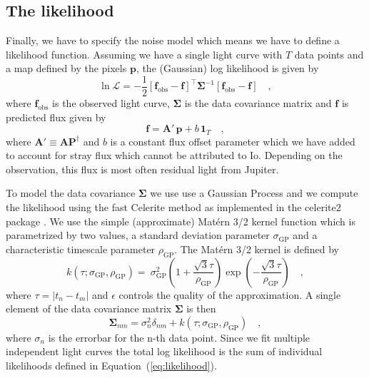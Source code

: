 \documentclass[linenumbers,modern]{aastex62}
\begin{document}
\subsection{The likelihood}
\label{ssec:likelihood}
Finally, we have to specify the noise model which means we have to define a likelihood function.
Assuming we have a single light curve with $T$ data points and a map defined by the pixels $\mathbf{p}$, the (Gaussian) log likelihood is given by
\begin{equation}
    \ln\mathcal{L}=-\frac{1}{2}\left[\mathbf{f}_\mathrm{obs}-\mathbf{f} \right]^{\top}
    \boldsymbol{\Sigma}^{-1}\left[\mathbf{f}_\mathrm{obs}-\mathbf{f} \right]
    \quad,
    \label{eq:likelihood}
\end{equation}
where $\mathbf{f}_\mathrm{obs}$ is the observed light curve, $\boldsymbol{\Sigma}$ is the data covariance matrix and $\mathbf{f}$ is predicted flux given by
\begin{equation}
    \mathbf{f}=\mathbf{A}'\,\mathbf{p} +b\,\mathbf{1}_T
    \quad,
    \label{eq:flux_model}
\end{equation}
where $\mathbf{A}'\equiv\mathbf{A}\mathbf{P}^\dagger$ and $b$ is a constant flux offset parameter which we have added to account for stray flux which cannot be attributed to Io.
Depending on the observation, this flux is most often residual light from Jupiter.

To model the data covariance $\boldsymbol{\Sigma}$ we use use a Gaussian Process and we compute the likelihood using the fast Celerite method \citep{foreman-mackey2017} as implemented in the \textsf{celerite2} package \citep{foreman-mackey2017a,foreman-mackey2018}.
We use the simple (approximate) Mat\'ern 3/2 kernel function which is parametrized by two values, a standard deviation parameter $\sigma_\mathrm{GP}$ and a characteristic timescale parameter $\rho_\mathrm{GP}$.
The Mat\'ern 3/2 kernel is defined by
\begin{equation}
    k(\tau;\sigma_\mathrm{GP},
    \rho_\mathrm{GP})=\
    \sigma_\mathrm{GP}^{2}\left(1+\frac{\sqrt{3} \tau}{\rho_\mathrm{GP}}\right) \exp \left(-\frac{\sqrt{3} \tau}{\rho_\mathrm{GP}}\right)
    \quad,
\end{equation}
where $\tau=|t_n-t_m|$ and $\epsilon$ controls the quality of the approximation.
A single element of the data covariance matrix $\boldsymbol{\Sigma}$ is then 
\begin{equation}
    \boldsymbol{\Sigma}_{nm}=\sigma_n^2\delta_{nm} + k(\tau;\sigma_\mathrm{GP},\rho_\mathrm{GP})
    \quad,
    \label{eq:data_covariance_element}
\end{equation}
where $\sigma_n$ is the errorbar for the n-th data point.
Since we fit multiple independent light curves the total log likelihood is the sum of individual likelihoods defined in Equation~(\ref{eq:likelihood}).
\end{document}
